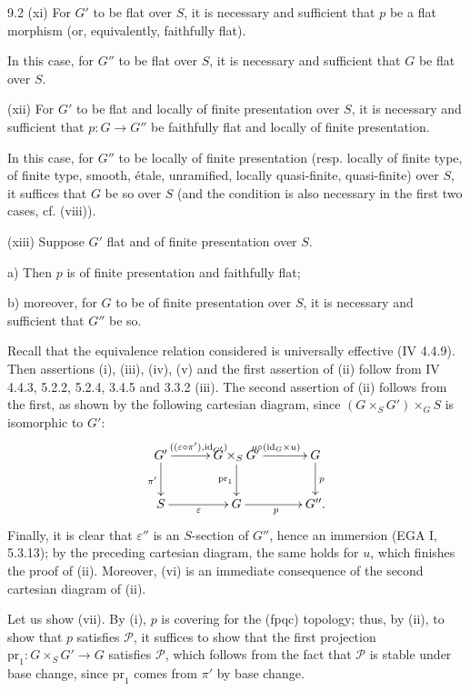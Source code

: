 \begin{proposition}{9.2}
(xi) For $G'$ to be flat over $S$, it is necessary and sufficient that $p$ be a flat morphism (or, equivalently, faithfully flat).

In this case, for $G''$ to be flat over $S$, it is necessary and sufficient that $G$ be flat over $S$.

(xii) For $G'$ to be flat and locally of finite presentation over $S$, it is necessary and sufficient that $p:G\to G''$ be faithfully flat and locally of finite presentation.

In this case, for $G''$ to be locally of finite presentation (resp. locally of finite type, of finite type, smooth, étale, unramified, locally quasi-finite, quasi-finite) over $S$, it suffices that $G$ be so over $S$ (and the condition is also necessary in the first two cases, cf. (viii)).

(xiii) Suppose $G'$ flat and of finite presentation over $S$.

a) Then $p$ is of finite presentation and faithfully flat;

b) moreover, for $G$ to be of finite presentation over $S$, it is necessary and sufficient that $G''$ be so.
\end{proposition}
Recall that the equivalence relation considered is universally effective (IV 4.4.9). Then assertions (i), (iii), (iv), (v) and the first assertion of (ii) follow from IV 4.4.3, 5.2.2, 5.2.4, 3.4.5 and 3.3.2 (iii). The second assertion of (ii) follows from the first, as shown by the following cartesian diagram, since $(G\times_S G')\times_G S$ is isomorphic to $G'$:
\[
\xymatrix@C=30pt{G'\ar[r]^{((\varepsilon\circ\pi'),\mathrm{id}_{G'})}\ar[d]_{\pi'}&G\times_S G'\ar[r]^{\mu\circ(\mathrm{id}_G\times u)}\ar[d]_{\mathrm{pr}_1}&G\ar[d]^p\\S\ar[r]_\varepsilon&G\ar[r]_p&G''.}
\]
Finally, it is clear that $\varepsilon''$ is an $S$-section of $G''$, hence an immersion (EGA I, 5.3.13); by the preceding cartesian diagram, the same holds for $u$, which finishes the proof of (ii). Moreover, (vi) is an immediate consequence of the second cartesian diagram of (ii).

Let us show (vii). By (i), $p$ is covering for the (fpqc) topology; thus, by (ii), to show that $p$ satisfies $\mathscr P$, it suffices to show that the first projection $\mathrm{pr}_1:G\times_S G'\to G$ satisfies $\mathscr P$, which follows from the fact that $\mathscr P$ is stable under base change, since $\mathrm{pr}_1$ comes from $\pi'$ by base change.
